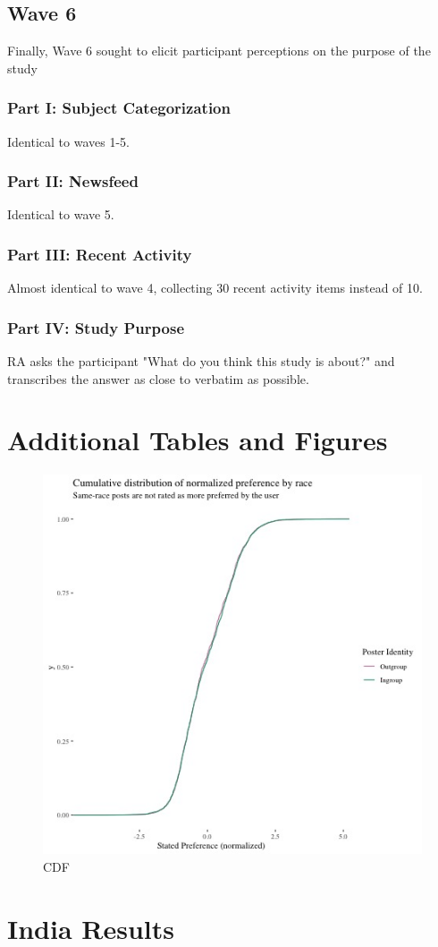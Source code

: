 \documentclass[12pt,letterpaper]{article}
\begin{document}
\subsection{Wave 6}

Finally, Wave 6 sought to elicit participant perceptions on the purpose of the study 

\subsubsection{Part I: Subject Categorization} Identical to waves 1-5.

\subsubsection{Part II: Newsfeed}  Identical to wave 5.

\subsubsection{Part III: Recent Activity} Almost identical to wave 4, collecting 30 recent activity items instead of 10.

\subsubsection{Part IV: Study Purpose} RA asks the participant "What do you think this study is about?" and transcribes the answer as close to verbatim as possible.

\section{Additional Tables and Figures}\label{app:tab_fig}

\begin{figure}[!h]
    \centering
    \includegraphics[scale=.8]{Output/Graphs/Audit/Stated preferences/US NF cdf norm preferences by ingroup.jpg}
    \caption{CDF}
    \label{fig:prefcdf}
\end{figure}


\section{India Results}\label{app:india}
\end{document}
